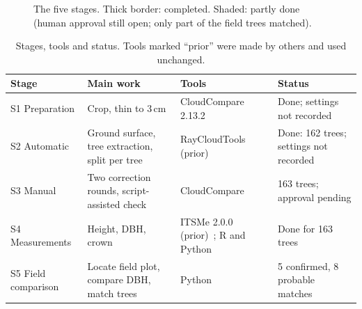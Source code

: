 \documentclass[runningheads]{llncs}
\begin{document}
\begin{figure}[!tb]
\centering
{}
\caption{The five stages. Thick border: completed. Shaded: partly done (human approval still open; only part of the field trees matched).}\label{fig:pipeline}
\end{figure}

\begin{table}[!tb]
\caption{Stages, tools and status. Tools marked ``prior'' were made by others and used unchanged.}\label{tab:stages}
\centering\footnotesize
\begin{tabular}{@{}L{1.95cm}L{3.55cm}L{2.55cm}L{3.0cm}@{}}
\toprule
Stage & Main work & Tools & Status\\
\midrule
S1 Preparation & Crop, thin to 3\,cm & CloudCompare 2.13.2 & Done; settings not recorded\\
S2 Automatic & Ground surface, tree extraction, split per tree & RayCloudTools (prior)~\cite{lowe2021} & Done: 162 trees; settings not recorded\\
S3 Manual & Two correction rounds, script-assisted check & CloudCompare & 163 trees; approval pending\\
S4 Measurements & Height, DBH, crown & ITSMe 2.0.0 (prior)~\cite{terryn2023}; R and Python & Done for 163 trees\\
S5 Field comparison & Locate field plot, compare DBH, match trees & Python & 5 confirmed, 8 probable matches\\
\bottomrule
\end{tabular}
\end{table}
\end{document}
